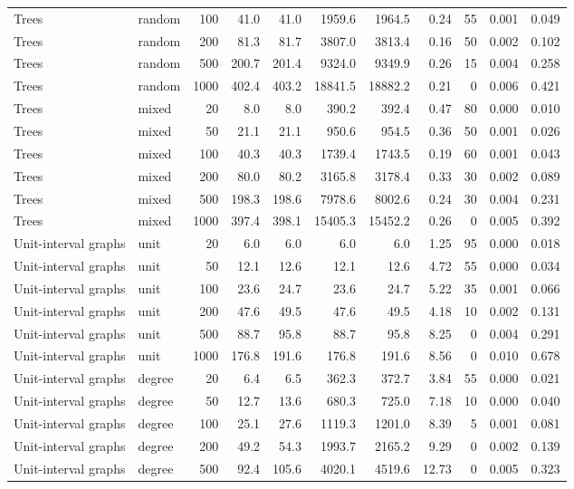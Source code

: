 \begin{tabular}{llrrrrrrrrr}
Trees & random & 100 & 41.0 & 41.0 & 1959.6 & 1964.5 & 0.24 & 55 & 0.001 & 0.049 \\
Trees & random & 200 & 81.3 & 81.7 & 3807.0 & 3813.4 & 0.16 & 50 & 0.002 & 0.102 \\
Trees & random & 500 & 200.7 & 201.4 & 9324.0 & 9349.9 & 0.26 & 15 & 0.004 & 0.258 \\
Trees & random & 1000 & 402.4 & 403.2 & 18841.5 & 18882.2 & 0.21 & 0 & 0.006 & 0.421 \\
Trees & mixed & 20 & 8.0 & 8.0 & 390.2 & 392.4 & 0.47 & 80 & 0.000 & 0.010 \\
Trees & mixed & 50 & 21.1 & 21.1 & 950.6 & 954.5 & 0.36 & 50 & 0.001 & 0.026 \\
Trees & mixed & 100 & 40.3 & 40.3 & 1739.4 & 1743.5 & 0.19 & 60 & 0.001 & 0.043 \\
Trees & mixed & 200 & 80.0 & 80.2 & 3165.8 & 3178.4 & 0.33 & 30 & 0.002 & 0.089 \\
Trees & mixed & 500 & 198.3 & 198.6 & 7978.6 & 8002.6 & 0.24 & 30 & 0.004 & 0.231 \\
Trees & mixed & 1000 & 397.4 & 398.1 & 15405.3 & 15452.2 & 0.26 & 0 & 0.005 & 0.392 \\
Unit-interval graphs & unit & 20 & 6.0 & 6.0 & 6.0 & 6.0 & 1.25 & 95 & 0.000 & 0.018 \\
Unit-interval graphs & unit & 50 & 12.1 & 12.6 & 12.1 & 12.6 & 4.72 & 55 & 0.000 & 0.034 \\
Unit-interval graphs & unit & 100 & 23.6 & 24.7 & 23.6 & 24.7 & 5.22 & 35 & 0.001 & 0.066 \\
Unit-interval graphs & unit & 200 & 47.6 & 49.5 & 47.6 & 49.5 & 4.18 & 10 & 0.002 & 0.131 \\
Unit-interval graphs & unit & 500 & 88.7 & 95.8 & 88.7 & 95.8 & 8.25 & 0 & 0.004 & 0.291 \\
Unit-interval graphs & unit & 1000 & 176.8 & 191.6 & 176.8 & 191.6 & 8.56 & 0 & 0.010 & 0.678 \\
Unit-interval graphs & degree & 20 & 6.4 & 6.5 & 362.3 & 372.7 & 3.84 & 55 & 0.000 & 0.021 \\
Unit-interval graphs & degree & 50 & 12.7 & 13.6 & 680.3 & 725.0 & 7.18 & 10 & 0.000 & 0.040 \\
Unit-interval graphs & degree & 100 & 25.1 & 27.6 & 1119.3 & 1201.0 & 8.39 & 5 & 0.001 & 0.081 \\
Unit-interval graphs & degree & 200 & 49.2 & 54.3 & 1993.7 & 2165.2 & 9.29 & 0 & 0.002 & 0.139 \\
Unit-interval graphs & degree & 500 & 92.4 & 105.6 & 4020.1 & 4519.6 & 12.73 & 0 & 0.005 & 0.323 \\

\end{tabular}
